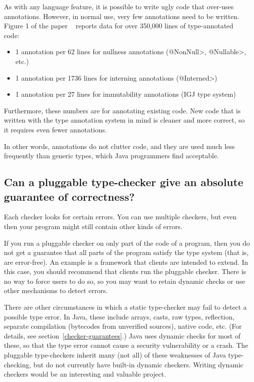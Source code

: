 As with any language feature, it is possible to write ugly code that
over-uses annotations.  However, in normal use, very few annotations need
to be written.  Figure 1 of the paper
~\cite{PapiACPE2008} reports data for over
350,000 lines of type-annotated code:

\begin{itemize}
\item
    1 annotation per 62 lines for nullness annotations (\<@NonNull>, \<@Nullable>, etc.)
\item
    1 annotation per 1736 lines for interning annotations (\<@Interned>)
\item
    1 annotation per 27 lines for immutability annotations (IGJ type system)
\end{itemize}

Furthermore, these numbers are for annotating existing code.  New code that
is written with the type annotation system in mind is cleaner and more
correct, so it requires even fewer annotations.

In other words, annotations do not clutter code, and they are used much
less frequently than generic types, which Java programmers find acceptable.


\subsection{Can a pluggable type-checker give an absolute guarantee of correctness?}

Each checker looks for certain errors.  You can use multiple checkers, but
even then your program might still contain other kinds of errors.

If you run a pluggable checker on only part of the code of a program, then
you do not get a guarantee that all parts of the program satisfy the type
system (that is, are error-free).  An example is a framework that clients
are intended to extend.  In this case, you should recommend that clients
run the pluggable checker.  There is no way to force users to do so, so you
may want to retain dynamic checks or use other mechanisms to detect errors.

There are other circumstances in which a static type-checker may fail to
detect a possible type error.  In Java, these include arrays, casts, raw
types, reflection, separate compilation (bytecodes from unverified sources),
native code, etc.  (For details, see section~\ref{checker-guarantees}.)
Java uses dynamic checks for most of these, so that the
type error cannot cause a security vulnerability or a crash.  The pluggable
type-checkers inherit many (not all) of these weaknesses of Java
type-checking, but do not currently have built-in dynamic checkers.
Writing dynamic checkers would be an interesting and valuable project.


